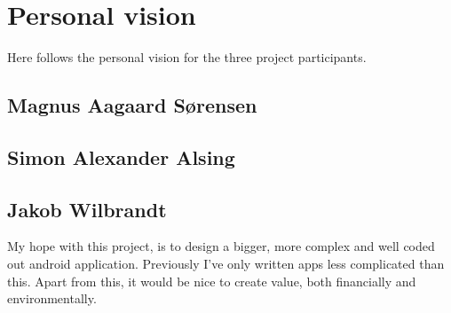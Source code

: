 
\chapter{Personal vision}
Here follows the personal vision for the three project participants.

\section{Magnus Aagaard Sørensen}

\section{Simon Alexander Alsing}

\section{Jakob Wilbrandt}

My hope with this project, is to design a bigger, more complex and well coded out android application. Previously I've only written apps less complicated than this. Apart from this, it would be nice to create value, both financially and environmentally.
